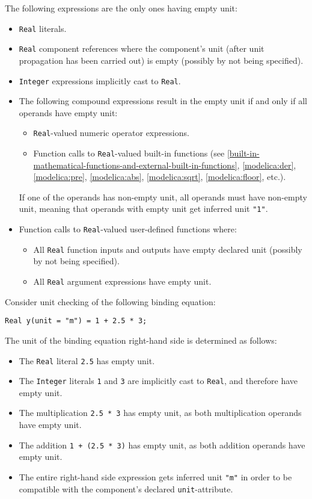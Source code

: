 The following expressions are the only ones having empty unit:
\begin{itemize}
\item
  \lstinline!Real! literals.
\item
  \lstinline!Real! component references where the component's unit (after unit propagation has been carried out) is empty (possibly by not being specified).
\item
  \lstinline!Integer! expressions implicitly cast to \lstinline!Real!.
\item
  The following compound expressions result in the empty unit if and only if all operands have empty unit:
  \begin{itemize}
    \item \lstinline!Real!-valued numeric operator expressions.
    \item Function calls to \lstinline!Real!-valued built-in functions (see \cref{built-in-mathematical-functions-and-external-built-in-functions}, \cref{modelica:der}, \cref{modelica:pre}, \cref{modelica:abs}, \cref{modelica:sqrt}, \cref{modelica:floor}, etc.).
  \end{itemize}
  If one of the operands has non-empty unit, all operands must have non-empty unit, meaning that operands with empty unit get inferred unit \lstinline!"1"!.
\item
  Function calls to \lstinline!Real!-valued user-defined functions where:
  \begin{itemize}
    \item All \lstinline!Real! function inputs and outputs have empty declared unit (possibly by not being specified).
    \item All \lstinline!Real! argument expressions have empty unit.
  \end{itemize}
\end{itemize}

\begin{example}
Consider unit checking of the following binding equation:
\begin{lstlisting}[language=modelica]
Real y(unit = "m") = 1 + 2.5 * 3;
\end{lstlisting}
The unit of the binding equation right-hand side is determined as follows:
\begin{itemize}
\item The \lstinline!Real! literal \lstinline!2.5! has empty unit.
\item The \lstinline!Integer! literals \lstinline!1! and \lstinline!3! are implicitly cast to \lstinline!Real!, and therefore have empty unit.
\item The multiplication \lstinline!2.5 * 3! has empty unit, as both multiplication operands have empty unit.
\item The addition \lstinline!1 + (2.5 * 3)! has empty unit, as both addition operands have empty unit.
\item The entire right-hand side expression gets inferred unit \lstinline!"m"! in order to be compatible with the component's declared \lstinline!unit!-attribute.
\end{itemize}
\end{example}

